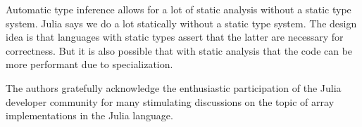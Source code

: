 \documentclass[preprint]{sigplanconf}
\begin{document}
Automatic type inference allows for a lot of static analysis without a static
type system. Julia says we do a lot statically without a static type system.
The design idea is that languages with static types assert that the latter are
necessary for correctness. But it is also possible that with static analysis
that the code can be more performant due to specialization.

%

\acks

The authors gratefully acknowledge the enthusiastic participation of the Julia
developer community for many stimulating discussions on the topic of array
implementations in the Julia language.



{}





\end{document}
